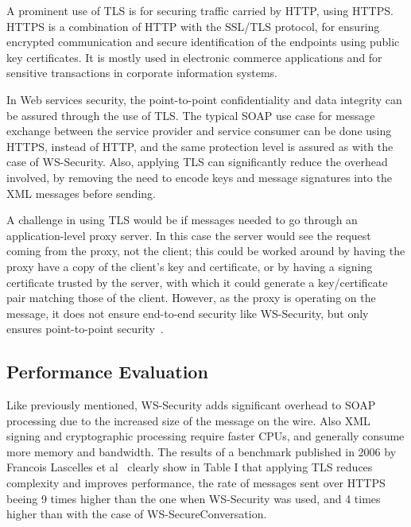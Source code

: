 A prominent use of TLS is for securing traffic carried by HTTP, using HTTPS. HTTPS is a combination of HTTP with the SSL/TLS protocol, for ensuring encrypted communication and secure identification of the endpoints using public key certificates. It is mostly used in electronic commerce applications and for sensitive transactions in corporate information systems.

In Web services security, the point-to-point confidentiality and data integrity can be assured through the use of TLS. The typical SOAP use case for message exchange between the service provider and service consumer can be done using HTTPS, instead of HTTP, and the same protection level is assured as with the case of WS-Security. Also, applying TLS can significantly reduce the overhead involved, by removing the need to encode keys and message signatures into the XML messages before sending.

A challenge in using TLS would be if messages needed to go through an application-level proxy server. In this case the server would see the request coming from the proxy, not the client; this could be worked around by having the proxy have a copy of the client's key and certificate, or by having a signing certificate trusted by the server, with which it could generate a key/certificate pair matching those of the client. However, as the proxy is operating on the message, it does not ensure end-to-end security like WS-Security, but only ensures point-to-point security~\cite{wiki-ws-sec}.


\subsection{Performance Evaluation}
\label{subsec:ws-sec-perf}

Like previously mentioned, WS-Security adds significant overhead to SOAP processing due to the increased size of the message on the wire. Also XML signing and cryptographic processing require faster CPUs, and generally consume more memory and bandwidth.
The results of a benchmark published in 2006 by Francois Lascelles et al~\cite{ws-sec-perf} clearly show in Table I that applying TLS reduces complexity and improves performance, the rate of messages sent over HTTPS beeing 9 times higher than the one when WS-Security was used, and 4 times higher than with the case of WS-SecureConversation. 

